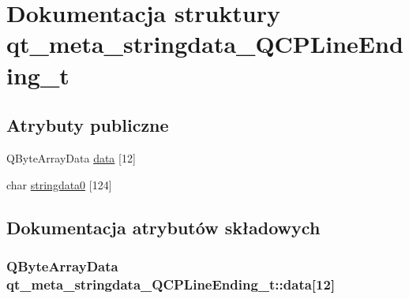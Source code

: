 \hypertarget{structqt__meta__stringdata___q_c_p_line_ending__t}{}\section{Dokumentacja struktury qt\+\_\+meta\+\_\+stringdata\+\_\+\+Q\+C\+P\+Line\+Ending\+\_\+t}
\label{structqt__meta__stringdata___q_c_p_line_ending__t}
\subsection*{Atrybuty publiczne}
\begin{DoxyCompactItemize}
\item 
Q\+Byte\+Array\+Data \hyperlink{structqt__meta__stringdata___q_c_p_line_ending__t_afd1b8860d3c0d66e6e4abf54197c47e6}{data} \mbox{[}12\mbox{]}
\item 
char \hyperlink{structqt__meta__stringdata___q_c_p_line_ending__t_a20c616613071fe30d8f5bcf67c6851b2}{stringdata0} \mbox{[}124\mbox{]}
\end{DoxyCompactItemize}


\subsection{Dokumentacja atrybutów składowych}
\subsubsection[{\texorpdfstring{data}{data}}]{\setlength{\rightskip}{0pt plus 5cm}Q\+Byte\+Array\+Data qt\+\_\+meta\+\_\+stringdata\+\_\+\+Q\+C\+P\+Line\+Ending\+\_\+t\+::data\mbox{[}12\mbox{]}}\hypertarget{structqt__meta__stringdata___q_c_p_line_ending__t_afd1b8860d3c0d66e6e4abf54197c47e6}{}\label{structqt__meta__stringdata___q_c_p_line_ending__t_afd1b8860d3c0d66e6e4abf54197c47e6}
